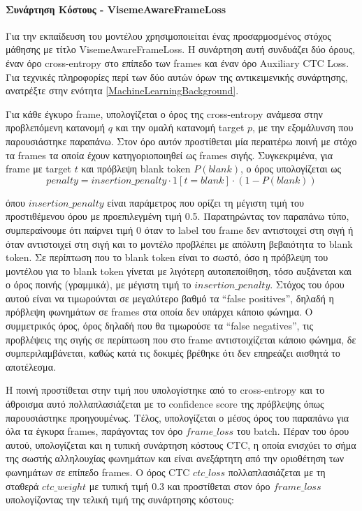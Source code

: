 \paragraph{Συνάρτηση Κόστους - VisemeAwareFrameLoss}

Για την εκπαίδευση του μοντέλου χρησιμοποιείται ένας προσαρμοσμένος στόχος μάθησης με τίτλο VisemeAwareFrameLoss. Η συνάρτηση αυτή συνδυάζει δύο όρους, έναν όρο cross-entropy στο επίπεδο των frames και έναν όρο Auxiliary CTC Loss. Για τεχνικές πληροφορίες περί των δύο αυτών όρων της αντικειμενικής συνάρτησης, ανατρέξτε στην ενότητα \ref{MachineLearningBackground}.

Για κάθε έγκυρο frame, υπολογίζεται ο όρος της cross-entropy ανάμεσα στην προβλεπόμενη κατανομή $q$ και την ομαλή κατανομή target $p$, με την εξομάλυνση που παρουσιάστηκε παραπάνω. Στον όρο αυτόν προστίθεται μία περαιτέρω ποινή με στόχο τα frames τα οποία έχουν κατηγοριοποιηθεί ως frames σιγής. Συγκεκριμένα, για frame με target $t$ και πρόβλεψη blank token $P(blank)$, ο όρος υπολογίζεται ως 
\[
penalty = insertion\_penalty \cdot 1[t = blank] \cdot (1 - P(blank))
\]

όπου $insertion\_penalty$ είναι παράμετρος που ορίζει τη μέγιστη τιμή του προστιθέμενου όρου με προεπιλεγμένη τιμή 0.5. Παρατηρώντας τον παραπάνω τύπο, συμπεραίνουμε ότι παίρνει τιμή 0 όταν το label του frame δεν αντιστοιχεί στη σιγή ή όταν αντιστοιχεί στη σιγή και το μοντέλο προβλέπει με απόλυτη βεβαιότητα το blank token. Σε περίπτωση που το blank token είναι το σωστό, όσο η πρόβλεψη του μοντέλου για το blank token γίνεται με λιγότερη αυτοπεποίθηση, τόσο αυξάνεται και ο όρος ποινής (γραμμικά), με μέγιστη τιμή το $insertion\_penalty$. Στόχος του όρου αυτού είναι να τιμωρούνται σε μεγαλύτερο βαθμό τα ``false positives'', δηλαδή η πρόβλεψη φωνημάτων σε frames στα οποία δεν υπάρχει κάποιο φώνημα. Ο συμμετρικός όρος, όρος δηλαδή που θα τιμωρούσε τα ``false negatives'', τις προβλέψεις της σιγής σε περίπτωση που στο frame αντιστοιχίζεται κάποιο φώνημα, δε συμπεριλαμβάνεται, καθώς κατά τις δοκιμές βρέθηκε ότι δεν επηρεάζει αισθητά το αποτέλεσμα.

Η ποινή προστίθεται στην τιμή που υπολογίστηκε από το cross-entropy και το άθροισμα αυτό πολλαπλασιάζεται με το confidence score της πρόβλεψης όπως παρουσιάστηκε προηγουμένως. Τέλος, υπολογίζεται ο μέσος όρος του παραπάνω για όλα τα έγκυρα frames, παράγοντας τον όρο $frame\_loss$ του batch. Πέραν του όρου αυτού, υπολογίζεται και η τυπική συνάρτηση κόστους CTC, η οποία ενισχύει το σήμα της σωστής αλληλουχίας φωνημάτων και είναι ανεξάρτητη από την οριοθέτηση των φωνημάτων σε επίπεδο frames. Ο όρος CTC $ctc\_loss$ πολλαπλασιάζεται με τη σταθερά $ctc\_weight$ με τυπική τιμή 0.3 και προστίθεται στον όρο $frame\_loss$ υπολογίζοντας την τελική τιμή της συνάρτησης κόστους:

